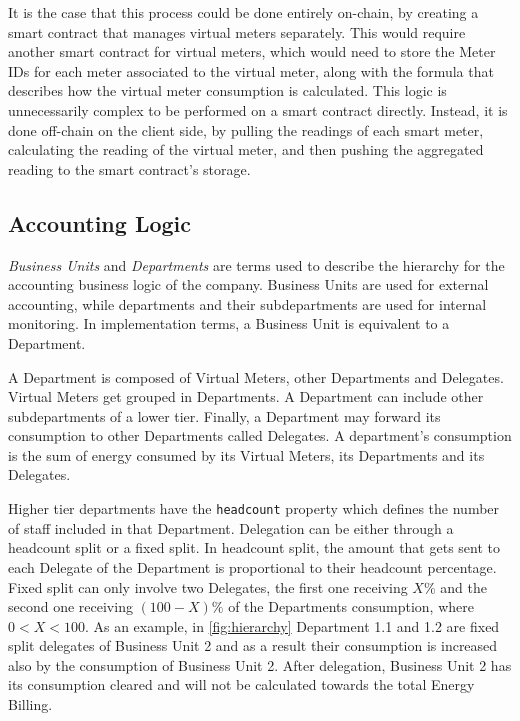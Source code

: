 It is the case that this process could be done entirely on-chain, by creating a smart contract that manages virtual meters separately. This would require another smart contract for virtual meters, which would need to store the Meter IDs for each meter associated to the virtual meter, along with the formula that describes how the virtual meter consumption is calculated. This logic is unnecessarily complex to be performed on a smart contract directly. Instead, it is done off-chain on the client side, by pulling the readings of each smart meter, calculating the reading of the virtual meter, and then pushing the aggregated reading to the smart contract's storage.

\subsection{Accounting Logic} \label{billing}

\textit{Business Units} and \textit{Departments} are terms used to describe the hierarchy for the accounting business logic of the company. Business Units are used for external accounting, while departments and their subdepartments are used for internal monitoring. In implementation terms, a Business Unit is equivalent to a Department.

A Department is composed of Virtual Meters, other Departments and Delegates. Virtual Meters get grouped in Departments. A Department can include other subdepartments of a lower tier. Finally, a Department may forward its consumption to other Departments called Delegates. A department's consumption is the sum of energy consumed by its Virtual Meters, its Departments and its Delegates. 



Higher tier departments have the \texttt{headcount} property which defines the number of staff included in that Department. Delegation can be either through a headcount split or a fixed split. In headcount split, the amount that gets sent to each Delegate of the Department is proportional to their headcount percentage. Fixed split can only involve two Delegates, the first one receiving $X\%$ and the second one receiving $(100-X)\%$ of the Departments consumption, where $0<X<100$. As an example, in \ref{fig:hierarchy} Department 1.1 and 1.2 are fixed split delegates of Business Unit 2 and as a result their consumption is increased also by the consumption of Business Unit 2. After delegation, Business Unit 2 has its consumption cleared and will not be calculated towards the total Energy Billing.

